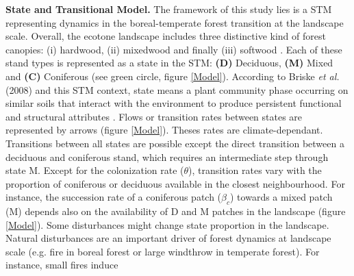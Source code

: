 \textbf{State and Transitional Model.} The framework of this study lies is a
STM representing dynamics in the boreal-temperate forest transition at the
landscape scale.  Overall, the ecotone landscape includes three distinctive
kind of forest canopies: (i) hardwood, (ii) mixedwood and finally (iii)
softwood \cite{Fisichelli2013}. 
Each of these stand types is represented as a
state in the STM: \textbf{(D)} Deciduous, \textbf{(M)} Mixed and \textbf{(C)}
Coniferous (see green circle, figure \ref{Model}). 
According to Briske\textit{
et al.} (2008) and this STM context, state means a plant community phase
occurring on similar soils that interact with the environment to produce
persistent functional and structural attributes \cite{Briske2008}. Flows or
transition rates between states are represented by arrows (figure
\ref{Model}). 
Theses rates are climate-dependant. Transitions between all states
are possible except the direct transition between a deciduous and coniferous
stand, which requires an intermediate
step through state M. Except for the colonization rate ($\theta$), transition rates
vary with the proportion of coniferous or deciduous available in the
closest neighbourhood. For instance, the succession rate of a coniferous patch
($\beta_c$) towards a mixed patch (M) depends also on the availability of D and
M patches in the landscape (figure \ref{Model}). 
Some disturbances might
change state proportion in the landscape. Natural disturbances are an important
driver of forest dynamics at landscape scale (e.g. fire in boreal forest or
large windthrow in temperate forest). For instance, small fires induce
